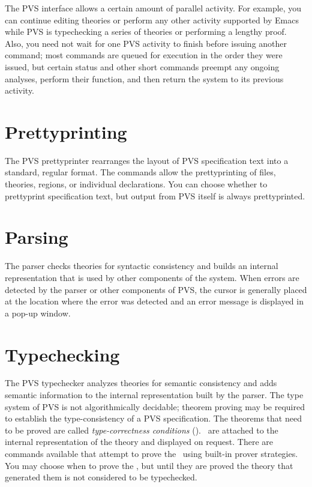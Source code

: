 The PVS interface allows a certain amount of parallel activity.  For
example, you can continue editing theories or perform any other activity
supported by Emacs while PVS is typechecking a series of theories or
performing a lengthy proof.  Also, you need not wait for one PVS activity
to finish before issuing another command; most commands are queued for
execution in the order they were issued, but certain status and other
short commands preempt any ongoing analyses, perform their function, and
then return the system to its previous activity.

\section*{Prettyprinting}

The PVS prettyprinter rearranges the layout of PVS specification text into
a standard, regular format.  The commands allow the prettyprinting of
files, theories, regions, or individual declarations.  You can choose
whether to prettyprint specification text, but output from PVS itself is
always prettyprinted.

\section*{Parsing}

The parser checks theories for syntactic consistency and builds an
internal representation that is used by other components of the system.
When errors are detected by the parser or other components of PVS, the
cursor is generally placed at the location where the error was detected
and an error message is displayed in a pop-up window.

\section*{Typechecking}
\label{typechecking}

The PVS typechecker analyzes theories for semantic consistency and adds
semantic information to the internal representation built by the parser.
The type system of PVS is not algorithmically decidable; theorem proving
may be required to establish the type-consistency of a PVS specification.
The theorems that need to be proved are called \emph{type-correctness
conditions} (\tccs).  \tccs\ are
attached to the internal representation of the theory and displayed on
request.  There are commands available that attempt to prove the \tccs\
using built-in prover strategies.  You may choose when to prove the \tccs,
but until they are proved the theory that generated them is not considered
to be typechecked.

